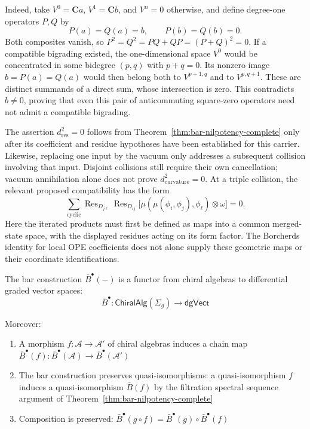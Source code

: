 \begin{remark}
Indeed, take $V^0=\mathbf C a$, $V^1=\mathbf C b$, and $V^n=0$ otherwise,
and define degree-one operators $P,Q$ by
\[
P(a)=Q(a)=b,\qquad P(b)=Q(b)=0.
\]
Both composites vanish, so
$P^2=Q^2=PQ+QP=(P+Q)^2=0$.
If a compatible bigrading existed, the one-dimensional space $V^0$
would be concentrated in some bidegree $(p,q)$ with $p+q=0$.
Its nonzero image $b=P(a)=Q(a)$ would then belong both to
$V^{p+1,q}$ and to $V^{p,q+1}$.
These are distinct summands of a direct sum, whose intersection is zero.
This contradicts $b\ne0$, proving that even this pair of anticommuting
square-zero operators need not admit a compatible bigrading.

The assertion $d_{\mathrm{res}}^2=0$ follows from
Theorem~\ref{thm:bar-nilpotency-complete} only after its coefficient and
residue hypotheses have been established for this carrier.
Likewise, replacing one input by the vacuum only addresses a subsequent
collision involving that input.  Disjoint collisions still require their
own cancellation; vacuum annihilation alone does not prove
$d_{\mathrm{curvature}}^2=0$.
At a triple collision, the relevant proposed compatibility has the form
\begin{equation}\label{eq:borcherds-pole-mix}
\sum_{\mathrm{cyclic}}\operatorname{Res}_{D_{j\ell}}
 \operatorname{Res}_{D_{ij}}
 \bigl[\mu(\mu(\phi_i,\phi_j),\phi_\ell)\otimes\omega\bigr]=0.
\end{equation}
Here the iterated products must first be defined as maps into a common
merged-state space, with the displayed residues acting on its form factor.
The Borcherds identity for local OPE coefficients does not alone supply
these geometric maps or their coordinate identifications.
\end{remark}

\begin{corollary}\label{cor:bar-functorial}
The bar construction $\bar{B}^{\bullet}(-)$ is a functor from chiral algebras to differential graded vector spaces:
\[\bar{B}^{\bullet}: \mathsf{ChiralAlg}(\Sigma_g) \to \mathsf{dgVect}\]

Moreover:
\begin{enumerate}
\item A morphism $f: \mathcal{A} \to \mathcal{A}'$ of chiral algebras induces a chain map $\bar{B}^{\bullet}(f): \bar{B}^{\bullet}(\mathcal{A}) \to \bar{B}^{\bullet}(\mathcal{A}')$
\item The bar construction preserves quasi-isomorphisms: a quasi-isomorphism $f$ induces a quasi-isomorphism $\bar{B}(f)$ by the filtration spectral sequence argument of Theorem~\ref{thm:bar-nilpotency-complete}
\item Composition is preserved: $\bar{B}^{\bullet}(g \circ f) = \bar{B}^{\bullet}(g) \circ \bar{B}^{\bullet}(f)$
\end{enumerate}
\end{corollary}

